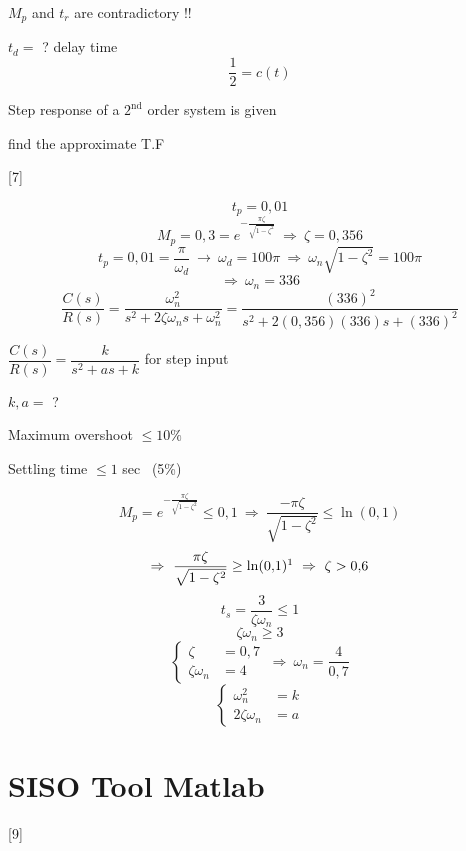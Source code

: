 \documentclass[11pt,a4paper]{article}
\begin{document}
$M_p$ and $t_r$ are contradictory !!

$t_d=$ ? delay time
\[ \frac{1}{2}=c(t) \]

\begin{ornek}
Step response of a $2^{\mathrm{nd}}$ order system is given

find the approximate T.F

[7]
\end{ornek}

\[ t_p=0{,}01 \]
\[ M_p=0{,}3=e^{-\frac{\pi\zeta}{\sqrt{1-\zeta^2}}}\ \Rightarrow\ \zeta=0{,}356 \]
\[ t_p=0{,}01=\frac{\pi}{\omega_d}\ \to\ \omega_d=100\pi\ \Rightarrow\ \omega_n\sqrt{1-\zeta^2}=100\pi \]
\[ \Rightarrow\ \omega_n=336 \]
\[ \frac{C(s)}{R(s)}=\frac{\omega_n^2}{s^2+2\zeta\omega_n s+\omega_n^2}=\frac{(336)^2}{s^2+2(0{,}356)(336)s+(336)^2} \]

\begin{ornek}
$\dfrac{C(s)}{R(s)}=\dfrac{k}{s^2+as+k}$ \quad for step input

$k,a=$ ?

Maximum overshoot $\le 10\%$

Settling time $\le 1$ sec \ (5\%)
\end{ornek}
\[ M_p=e^{-\frac{\pi\zeta}{\sqrt{1-\zeta^2}}}\le 0{,}1\ \Rightarrow\ \frac{-\pi\zeta}{\sqrt{1-\zeta^2}}\le\ln(0{,}1) \]
\[ \Rightarrow\ \frac{\pi\zeta}{\sqrt{1-\zeta^2}}\ge\ln(0{,}1)\footnotemark\ \Rightarrow\ \zeta>0{,}6 \]
\[ t_s=\frac{3}{\zeta\omega_n}\le 1 \]
\[ \zeta\omega_n\ge 3 \]
\[ \left\{\begin{aligned}\zeta&=0{,}7\\ \zeta\omega_n&=4\end{aligned}\right.\ \Rightarrow\ \omega_n=\frac{4}{0{,}7} \]
\[ \left\{\begin{aligned}\omega_n^2&=k\\ 2\zeta\omega_n&=a\end{aligned}\right. \]

\section{SISO Tool Matlab}
[9]
\end{document}
